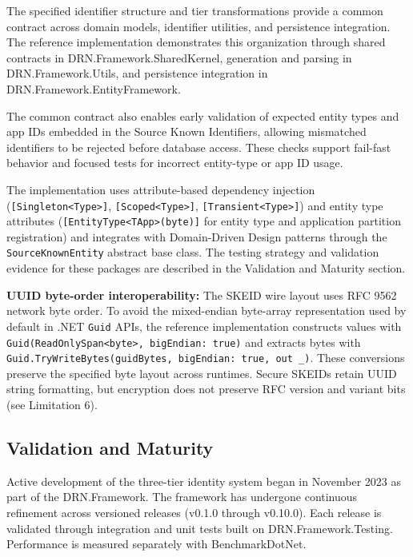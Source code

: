 \documentclass[a4paper,fleqn]{cas-sc}
\begin{document}
The specified identifier structure and tier transformations provide a
common contract across domain models, identifier utilities, and
persistence integration. The reference implementation demonstrates this
organization through shared contracts in DRN.Framework.SharedKernel,
generation and parsing in DRN.Framework.Utils, and persistence
integration in DRN.Framework.EntityFramework.

The common contract also enables early validation of expected entity
types and app IDs embedded in the Source Known Identifiers, allowing
mismatched identifiers to be rejected before database access. These
checks support fail-fast behavior and focused tests for incorrect
entity-type or app ID usage.

The implementation uses attribute-based dependency injection
(\texttt{{[}Singleton\textless{}Type\textgreater{}{]}},
\texttt{{[}Scoped\textless{}Type\textgreater{}{]}},
\texttt{{[}Transient\textless{}Type\textgreater{}{]}}) and entity type
attributes (\texttt{{[}EntityType\textless{}TApp\textgreater{}(byte){]}}
for entity type and application partition registration) and integrates
with Domain-Driven Design \citep{evans2003} patterns through the
\texttt{SourceKnownEntity} abstract base class. The testing strategy and
validation evidence for these packages are described in the Validation
and Maturity section.

\textbf{UUID byte-order interoperability:} The SKEID wire layout uses
RFC 9562 network byte order. To avoid the mixed-endian byte-array
representation used by default in .NET \texttt{Guid} APIs, the reference
implementation constructs values with
\texttt{Guid(ReadOnlySpan\textless{}byte\textgreater{},\ bigEndian:\ true)}
and extracts bytes with
\texttt{Guid.TryWriteBytes(guidBytes,\ bigEndian:\ true,\ out\ \_)}.
These conversions preserve the specified byte layout across runtimes.
Secure SKEIDs retain UUID string formatting, but encryption does not
preserve RFC version and variant bits (see Limitation 6).

\subsection{Validation and Maturity}\label{validation-and-maturity}

Active development of the three-tier identity system began in November
2023 as part of the DRN.Framework. The framework has undergone
continuous refinement across versioned releases (v0.1.0 through
v0.10.0). Each release is validated through integration and unit tests
built on DRN.Framework.Testing. Performance is measured separately with
BenchmarkDotNet.
\end{document}
